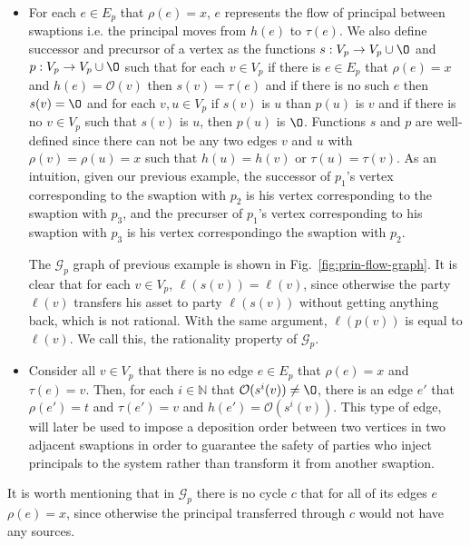 \begin{enumerate}
\begin{itemize}
        \item For each $e \in E_p$ that $\rho(e)=x$, $e$ represents the flow of principal between swaptions i.e. the principal moves from $h(e)$ to $\tau(e)$. We also define successor and precursor of a vertex as the functions $s: V_p \to V_p  \cup \O $ and $p: V_p \to V_p \cup \O$ such that for each $v \in V_p$ if there is $e \in E_p$ that $\rho(e)=x$ and $h(e)=\mathcal{O}(v)$ then $s(v)=\tau(e)$ and if there is no such $e$ then $s(v)=\O$ and for each $v, u \in V_p$ if $s(v)$ is $u$ than $p(u)$ is $v$ and if there  is no $v \in V_p$ such that $s(v)$ is $u$, then $p(u)$ is $\O$. Functions $s$ and $p$ are well-defined since there can not be any two edges $v$ and $u$ with $\rho(v) = \rho(u)= x$ such that $h(u) = h(v)$ or $\tau(u) = \tau(v)$. As an intuition, given our previous example, the successor of $p_1$'s vertex corresponding to the swaption with $p_2$ is his vertex corresponding to the swaption with $p_3$, and the precurser of $p_1$'s vertex corresponding to his swaption with $p_3$ is his vertex correspondingo the swaption with $p_2$.
        
        The $\mathcal{G}_{p}$ graph of previous example is shown in Fig.~\ref{fig:prin-flow-graph}. It is clear that for each $v \in V_p$, $\ell(s(v)) = \ell(v)$, since otherwise the party $\ell(v)$ transfers his asset to party $\ell(s(v))$ without getting anything back, which is not rational. With the same argument, $\ell(p(v))$ is equal to $\ell(v)$. We call this, the rationality property of $\mathcal{G}_{p}$.
        
        \item Consider all $v \in V_p$ that there is no edge $e \in E_p$ that $\rho(e) = x$ and $\tau(e) = v$. Then, for each $i \in \mathbb{N}$ that $\mathcal{O}(s^i(v)) \neq \O$, there is an edge $e'$ that $\rho(e') = t$ and $\tau(e') = v$ and $h(e') = \mathcal{O}(s^i(v))$. This type of edge, will later be used to impose a deposition order between two vertices in two adjacent swaptions in order to guarantee the safety of parties who inject principals to the system rather than transform it from another swaption.
        
        
    \end{itemize}

It is worth mentioning that in $\mathcal{G}_{p}$ there is no cycle $c$ that for all of its edges $e$  $\rho(e) = x$, since otherwise the principal transferred through $c$ would not have any sources.

\end{enumerate}



